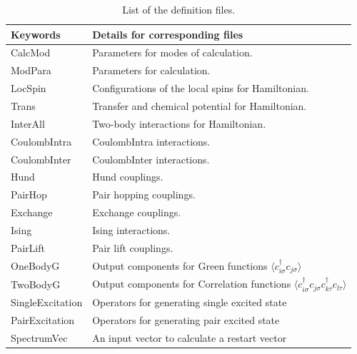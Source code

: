  \begin{table}[h!]
\begin{center}
  \begin{tabular}{ll|} \hline
           Keywords     & Details for corresponding files       \\   \hline\hline
           CalcMod      &   Parameters for modes of calculation.  \\  \hline  
           ModPara       &  Parameters for calculation.        \\ \hline   
           LocSpin         &  Configurations of the local spins for Hamiltonian.         \\ 
           Trans       &   Transfer and chemical potential for Hamiltonian.  \\
           InterAll  &   Two-body interactions for Hamiltonian. \\  
           CoulombIntra  &   CoulombIntra interactions. \\  
           CoulombInter  &   CoulombInter  interactions. \\  
           Hund  &   Hund couplings. \\  
           PairHop  &  Pair hopping couplings. \\  
           Exchange  &  Exchange couplings. \\  
           Ising  &  Ising interactions. \\  
           PairLift  &   Pair lift couplings. \\  
           OneBodyG         &   Output components for Green functions $\langle c_{i\sigma}^{\dagger}c_{j\sigma}\rangle$           \\   
           TwoBodyG &   Output components for Correlation functions $\langle c_{i\sigma}^{\dagger}c_{j\sigma}c_{k\tau}^{\dagger}c_{l\tau}\rangle$  \\ 
           {SingleExcitation} &   Operators for generating single excited state\\ 
           {PairExcitation} &   Operators for generating pair excited state\\   
           {SpectrumVec} &   An input vector to calculate a restart vector\\   
  \hline
  \end{tabular}
\end{center}
\caption{List of the definition files.}
\label{Table:Defs}
\end{table}%

\newpage
